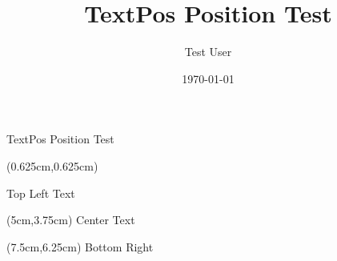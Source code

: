 \documentclass[aspectratio=169,xcolor=dvipsnames,professionalfonts]{beamer}
\title{TextPos Position Test}
\author{Test User}
\date{\today}
\begin{document}
\begin{frame}
\titlepage
\end{frame}

\begin{frame}{TextPos Position Test}

\begin{textblock*}{2.5cm}(0.625cm,0.625cm)
{\fontsize{16}{19.2}\selectfont\raggedright Top Left Text}
\end{textblock*}

\begin{textblock*}{2.5cm}(5cm,3.75cm)
{\fontsize{16}{19.2}\selectfont\centering Center Text}
\end{textblock*}

\begin{textblock*}{1.875cm}(7.5cm,6.25cm)
{\fontsize{16}{19.2}\selectfont\raggedleft Bottom Right}
\end{textblock*}
\end{frame}
\end{document}
